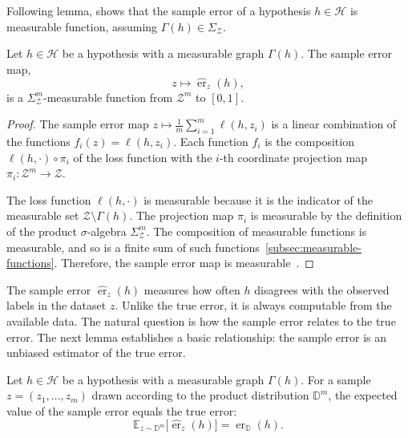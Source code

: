 Following lemma, shows that the sample error of a hypothesis $h \in \mathcal{H}$ is measurable function, assuming $\Gamma(h) \in \Sigma_{\mathcal{Z}}$.

\begin{lemma}
    \label{lem:sample-error-measurable}
    Let $h \in \mathcal{H}$ be a hypothesis with a measurable graph $\Gamma(h)$. The sample error map,
    \[
        z \mapsto \hat{\operatorname{er}}_{z}(h),
    \]
    is a $\Sigma_{\mathcal{Z}}^m$-measurable function from $\mathcal{Z}^m$ to $[0,1]$.
\end{lemma}

\begin{proof}

    The sample error map $z \mapsto \frac{1}{m}\sum_{i=1}^m \ell(h,z_i)$ is a linear combination of the functions $f_i(z) = \ell(h,z_i)$. Each function $f_i$ is the composition $\ell(h, \cdot) \circ \pi_i$ of the loss function with the $i$-th coordinate projection map $\pi_i: \mathcal{Z}^m \to \mathcal{Z}$.

    The loss function $\ell(h, \cdot)$ is measurable because it is the indicator of the measurable set $\mathcal{Z}\setminus\Gamma(h)$. The projection map $\pi_i$ is measurable by the definition of the product $\sigma$-algebra $\Sigma_{\mathcal{Z}}^m$. The composition of measurable functions is measurable, and so is a finite sum of such functions~\ref{subsec:measurable-functions}. Therefore, the sample error map is measurable~\cite[Prop 2.4]{FollandRealAnalysis}.
    \qedhere
\end{proof}

The sample error $\hat{\operatorname{er}}_z(h)$ measures how often $h$ disagrees with the observed labels in the dataset $z$.
Unlike the true error, it is always computable from the available data. The natural question is how the sample error relates to the true error. The next lemma establishes a basic relationship: the sample error is an unbiased estimator of the true error.

\begin{lemma}
    \label{lem:sample-error-unbiased}
    Let $h \in \mathcal{H}$ be a hypothesis with a measurable graph $\Gamma(h)$. For a sample $z = (z_1, \dots, z_m)$ drawn according to the product distribution $\mathbb{D}^m$, the expected value of the sample error equals the true error:
    \[
        \mathbb{E}_{z\sim\mathbb{D}^m}\bigl[\hat{\operatorname{er}}_{z}(h)\bigr] = \operatorname{er}_{\mathbb{D}}(h).
    \]
\end{lemma}

